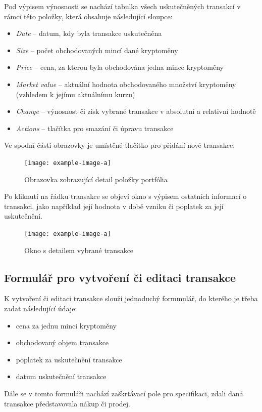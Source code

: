 \documentclass[12pt, a4paper]{article}
\begin{document}
    Pod výpisem výnosnosti se nachází tabulka všech uskutečněných transakcí v rámci této položky, která obsahuje následující sloupce:
    \begin{itemize}
        \item \textit{Date} -- datum, kdy byla transakce uskutečněna
        \item \textit{Size} -- počet obchodovaných mincí dané kryptoměny
        \item \textit{Price} -- cena, za kterou byla obchodována jedna mince kryptoměny
        \item \textit{Market value} -- aktuální hodnota obchodovaného množství kryptoměny (vzhledem k jejímu aktuálnímu kurzu)
        \item \textit{Change} -- výnosnost či zisk vybrané transakce v absolutní a relativní hodnotě
        \item \textit{Actions} -- tlačítka pro smazání či úpravu transakce
    \end{itemize}
    
    Ve spodní části obrazovky je umístěné tlačítko pro přidání nové transakce.

    \begin{figure}[!ht]
        \centering
        {\texttt{[image: example-image-a]}}
        \caption{Obrazovka zobrazující detail položky portfólia}
        \label{fig:entry-detail}
    \end{figure}
    
    Po kliknutí na řádku transakce se objeví okno s výpisem ostatních informací o transakci, jako například její hodnota
    v době vzniku či poplatek za její uskutečnění.
    
    \begin{figure}[!ht]
        \centering
        {\texttt{[image: example-image-a]}}
        \caption{Okno s detailem vybrané transakce}
        \label{fig:transaction-detail}
    \end{figure}
    
    \subsection{Formulář pro vytvoření či editaci transakce}
    K vytvoření či editaci transakce slouží jednoduchý formmulář, do kterého je třeba zadat následující údaje:
    
    \begin{itemize}
        \item cena za jednu minci kryptoměny
        \item obchodovaný objem transakce
        \item poplatek za uskutečnění transakce
        \item datum uskutečnění transakce
    \end{itemize}
    Dále se v tomto formuláři nachází zaškrtávací pole pro specifikaci, zdali daná transakce představovala nákup či prodej.
    
\end{document}

